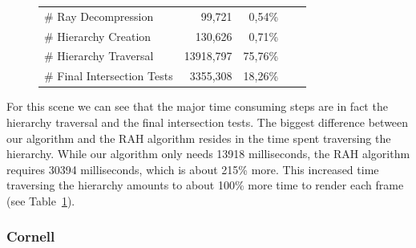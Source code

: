 \begin{figure}[!htb]
\begin{minipage}{0.725\linewidth}
\begin{tabular}[h]{l|rrrr}
            \quad \# Ray Decompression          & 99,721	& 0,54\%    \\
            \quad \# Hierarchy Creation         & 130,626	& 0,71\%    \\
            \quad \# Hierarchy Traversal        & 13918,797	& 75,76\%   \\
            \quad \# Final Intersection Tests   & 3355,308	& 18,26\%	\\
        \end{tabular}
        \label{table:office-time-results}
    \end{minipage}
\end{figure}

For this scene we can see that the major time consuming steps are in fact the hierarchy traversal and the final intersection tests. The biggest difference between our algorithm and the RAH algorithm resides in the time spent traversing the hierarchy. While our algorithm only needs 13918 milliseconds, the RAH algorithm requires 30394 milliseconds, which is about 215\% more. This increased time traversing the hierarchy amounts to about 100\% more time to render each frame (see Table~\ref{table:office-time-results}).

\vfill

\pagebreak

\subsubsection{Cornell}

